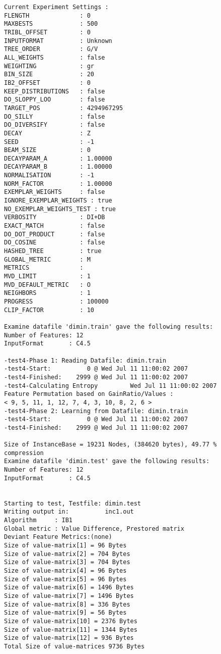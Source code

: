 \documentclass{report}
\begin{document}
\begin{footnotesize}
\begin{verbatim}
Current Experiment Settings :
FLENGTH              : 0
MAXBESTS             : 500
TRIBL_OFFSET         : 0
INPUTFORMAT          : Unknown
TREE_ORDER           : G/V
ALL_WEIGHTS          : false
WEIGHTING            : gr
BIN_SIZE             : 20
IB2_OFFSET           : 0
KEEP_DISTRIBUTIONS   : false
DO_SLOPPY_LOO        : false
TARGET_POS           : 4294967295
DO_SILLY             : false
DO_DIVERSIFY         : false
DECAY                : Z
SEED                 : -1
BEAM_SIZE            : 0
DECAYPARAM_A         : 1.00000
DECAYPARAM_B         : 1.00000
NORMALISATION        : -1
NORM_FACTOR          : 1.00000
EXEMPLAR_WEIGHTS     : false
IGNORE_EXEMPLAR_WEIGHTS : true
NO_EXEMPLAR_WEIGHTS_TEST : true
VERBOSITY            : DI+DB
EXACT_MATCH          : false
DO_DOT_PRODUCT       : false
DO_COSINE            : false
HASHED_TREE          : true
GLOBAL_METRIC        : M
METRICS              : 
MVD_LIMIT            : 1
MVD_DEFAULT_METRIC   : O
NEIGHBORS            : 1
PROGRESS             : 100000
CLIP_FACTOR          : 10

Examine datafile 'dimin.train' gave the following results:
Number of Features: 12
InputFormat       : C4.5

-test4-Phase 1: Reading Datafile: dimin.train
-test4-Start:          0 @ Wed Jul 11 11:00:02 2007
-test4-Finished:    2999 @ Wed Jul 11 11:00:02 2007
-test4-Calculating Entropy         Wed Jul 11 11:00:02 2007
Feature Permutation based on GainRatio/Values :
< 9, 5, 11, 1, 12, 7, 4, 3, 10, 8, 2, 6 >
-test4-Phase 2: Learning from Datafile: dimin.train
-test4-Start:          0 @ Wed Jul 11 11:00:02 2007
-test4-Finished:    2999 @ Wed Jul 11 11:00:02 2007

Size of InstanceBase = 19231 Nodes, (384620 bytes), 49.77 % compression
Examine datafile 'dimin.test' gave the following results:
Number of Features: 12
InputFormat       : C4.5


Starting to test, Testfile: dimin.test
Writing output in:          inc1.out
Algorithm     : IB1
Global metric : Value Difference, Prestored matrix
Deviant Feature Metrics:(none)
Size of value-matrix[1] = 96 Bytes 
Size of value-matrix[2] = 704 Bytes 
Size of value-matrix[3] = 704 Bytes 
Size of value-matrix[4] = 96 Bytes 
Size of value-matrix[5] = 96 Bytes 
Size of value-matrix[6] = 1496 Bytes 
Size of value-matrix[7] = 1496 Bytes 
Size of value-matrix[8] = 336 Bytes 
Size of value-matrix[9] = 56 Bytes 
Size of value-matrix[10] = 2376 Bytes 
Size of value-matrix[11] = 1344 Bytes 
Size of value-matrix[12] = 936 Bytes 
Total Size of value-matrices 9736 Bytes 


\end{verbatim}
\end{footnotesize}
\end{document}
